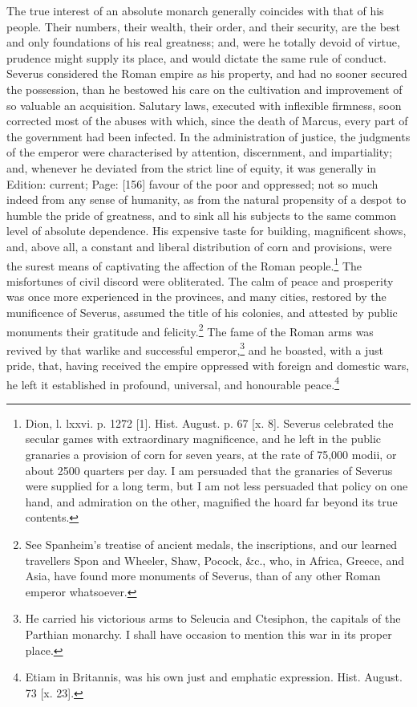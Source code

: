 The true interest of an absolute monarch generally coincides with that of his people. Their numbers, their wealth, their order, and their security, are the best and only foundations of his real greatness; and, were he totally devoid of virtue, prudence might supply its place, and would dictate the same rule of conduct. Severus considered the Roman empire as his property, and had no sooner secured the possession, than he bestowed his care on the cultivation and improvement of so valuable an acquisition. Salutary laws, executed with inflexible firmness, soon corrected most of the abuses with which, since the death of Marcus, every part of the government had been infected. In the administration of justice, the judgments of the emperor were characterised by attention, discernment, and impartiality; and, whenever he deviated from the strict line of equity, it was generally in Edition: current; Page: [156] favour of the poor and oppressed; not so much indeed from any sense of humanity, as from the natural propensity of a despot to humble the pride of greatness, and to sink all his subjects to the same common level of absolute dependence. His expensive taste for building, magnificent shows, and, above all, a constant and liberal distribution of corn and provisions, were the surest means of captivating the affection of the Roman people.\footnote{Dion, l. lxxvi. p. 1272 [1]. Hist. August. p. 67 [x. 8]. Severus celebrated the secular games with extraordinary magnificence, and he left in the public granaries a provision of corn for seven years, at the rate of 75,000 modii, or about 2500 quarters per day. I am persuaded that the granaries of Severus were supplied for a long term, but I am not less persuaded that policy on one hand, and admiration on the other, magnified the hoard far beyond its true contents.} The misfortunes of civil discord were obliterated. The calm of peace and prosperity was once more experienced in the provinces, and many cities, restored by the munificence of Severus, assumed the title of his colonies, and attested by public monuments their gratitude and felicity.\footnote{See Spanheim\texthebrew{}’s treatise of ancient medals, the inscriptions, and our learned travellers Spon and Wheeler, Shaw, Pocock, \&c., who, in Africa, Greece, and Asia, have found more monuments of Severus, than of any other Roman emperor whatsoever.} The fame of the Roman arms was revived by that warlike and successful emperor,\footnote{He carried his victorious arms to Seleucia and Ctesiphon, the capitals of the Parthian monarchy. I shall have occasion to mention this war in its proper place.} and he boasted, with a just pride, that, having received the empire oppressed with foreign and domestic wars, he left it established in profound, universal, and honourable peace.\footnote{Etiam in Britannis, was his own just and emphatic expression. Hist. August. 73 [x. 23].}

